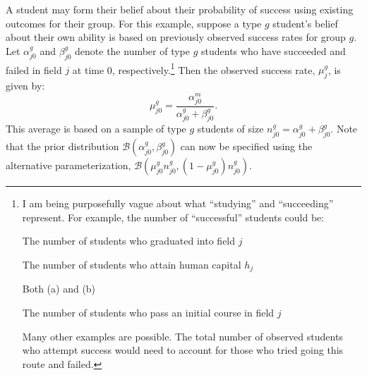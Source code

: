 \documentclass[10 pt]{article}
\newcommand{\pr}[1]{\left( #1 \right)}
\begin{document}
\begin{blist}
\item 
A student may form their belief about their probability of success using existing outcomes for their group.
For this example, suppose a type $g$ student's belief about their own ability is based on previously observed success rates for group $g$. 
Let $\alpha_{j0}^g$ and $\beta_{j0}^g$ denote the number of type $g$ students who have succeeded and failed in field $j$ at time 0, respectively.\footnote{
   I am being purposefully vague about what ``studying'' and ``succeeding'' represent.
   For example, the number of ``successful'' students could be:
   \begin{footcount}
      \item The number of students who graduated into field $j$
      \item The number of students who attain human capital $h_j$
      \item Both (a) and (b)
      \item The number of students who pass an initial course in field $j$
    \end{footcount} 
   Many other examples are possible. The total number of observed students who attempt success would need to account for those who tried going this route and failed. 
}  
Then the observed success rate, $\mu_{j}^g$, is given by:
\begin{equation*}
\mu_{j0}^g = 
  \frac{\alpha_{j0}^m}{\alpha_{j0}^g + \beta_{j0}^g}.
\end{equation*}
This average is based on a sample of type $g$ students of size $n_{j0}^g = \alpha_{j0}^g + \beta_{j0}^g$.
Note that the prior distribution $\mathcal{B} \pr{\alpha_{j0}^g, \beta_{j0}^g}$ can now be specified using the alternative parameterization, $\mathcal{B} \pr{\mu_{j0}^g n_{j0}^g, (1 - \mu_{j0}^g) n_{j0}^g}$.


\end{blist}
\end{document}
